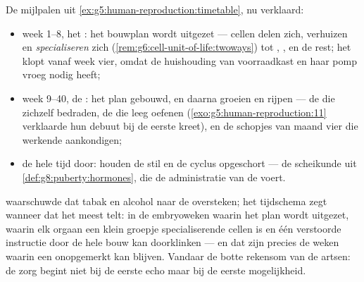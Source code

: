 \begin{proposition}\label{prop:g8:from-egg-to-birth:timetable}
De mijlpalen uit \cref{ex:g5:human-reproduction:timetable}, nu verklaard:
\begin{itemize}
  \item week 1--8, het \emph{}: het bouwplan wordt uitgezet ---
        cellen delen zich, verhuizen en \emph{specialiseren} zich
        (\cref{rem:g6:cell-unit-of-life:twoways}) tot , ,  en
        de rest; het  klopt vanaf week vier, omdat de huishouding van
        voorraadkast en  haar pomp vroeg nodig heeft;
  \item week 9--40, de \emph{}: het plan gebouwd, en daarna groeien
        en rijpen --- de  die zichzelf bedraden, de  die leeg
        oefenen (\cref{exo:g5:human-reproduction:11} verklaarde hun debuut
        bij de eerste kreet), en de schopjes van maand vier die werkende
         aankondigen;
  \item de hele tijd door:  houden de  stil en de cyclus
        opgeschort --- de scheikunde uit
        \cref{def:g8:puberty:hormones}, die de administratie van de
         voert.
\end{itemize}
\end{proposition}
\admitted

\begin{example}\label{ex:g8:from-egg-to-birth:earlycare}
 waarschuwde dat tabak en alcohol
naar de  oversteken; het tijdschema zegt wanneer dat het meest telt:
in de embryoweken waarin het plan wordt uitgezet, waarin elk orgaan een
klein groepje specialiserende cellen is en één verstoorde instructie door
de hele bouw kan doorklinken --- en dat zijn precies de weken waarin een
 onopgemerkt kan blijven. Vandaar de botte rekensom van de
artsen: de zorg begint niet bij de eerste echo maar bij de eerste
mogelijkheid.
\end{example}

